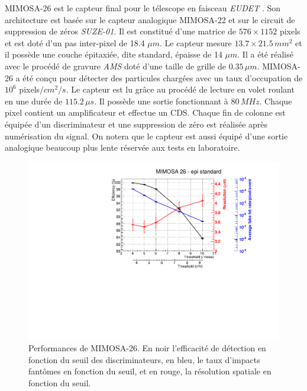    MIMOSA-26 est le capteur final pour le télescope en faisceau \textit{EUDET} \cite{Perrey:2012gqa}. Son architecture est bas\'ee sur le capteur analogique MIMOSA-22 et sur le circuit de suppression de z\'eros \textit{SUZE-01}. Il est constitu\'e d'une matrice de $576 \times 1152$ pixels et est dot\'e d'un pas inter-pixel de 18.4 $\mu m$. Le capteur mesure $13.7 \times 21.5 \, mm^2$ et il poss\`ede une couche \'epitaxi\'ee, dite standard, \'epaisse de 14 $\mu m$. Il a \'et\'e r\'ealis\'e avec le proc\'ed\'e de gravure \textit{AMS} dot\'e d'une taille de grille de $0.35 \, \mu m$. MIMOSA-26 a \'et\'e con\c{c}u pour d\'etecter des particules charg\'ees avec un taux d'occupation de $10^6$ pixels$/cm^2/s$. Le capteur est lu gr\^ace au proc\'ed\'e de lecture en volet roulant en une dur\'ee de $115.2 \, \mu s$. Il poss\`ede une sortie fonctionnant \`a $80 \, MHz$. Chaque pixel contient un amplificateur et effectue un CDS. Chaque fin de colonne est \'equipée d'un discriminateur et une suppression de z\'ero est r\'ealis\'ee apr\`es num\'erisation du signal. On notera que le capteur est aussi \'equipé d'une sortie analogique beaucoup plus lente r\'eserv\'ee aux tests en laboratoire.   
    
  \begin{figure}[!htb]
   \begin{center} 
    \includegraphics[scale=0.60]{./figures/Plots_PLUME/MIMOSA26_epi_std.pdf}
    \caption{Performances de MIMOSA-26. En noir l'efficacit\'e de d\'etection en fonction du seuil des discriminateurs, en bleu, le taux d'impacts fantômes en fonction du seuil, et en rouge, la r\'esolution spatiale en fonction du seuil.}
    \label{fig:perf_Mi26}
   \end{center}
  \end{figure}
   
